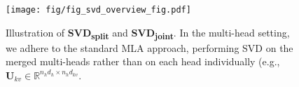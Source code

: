 \begin{figure}[t]
  \centering
  \texttt{[image: fig/fig\_svd\_overview\_fig.pdf]}
  \caption{Illustration of \textbf{SVD\textsubscript{split}} and \textbf{SVD\textsubscript{joint}}. In the multi-head setting, we adhere to the standard MLA approach, performing SVD on the merged multi-heads rather than on each head individually (e.g., $\bm{U}_{kv} \in \mathbb{R}^{n_hd_h \times n_hd_{kv}}$.}
  \vspace{-0.4cm}
  \label{fig:svd_overview}
\end{figure}

